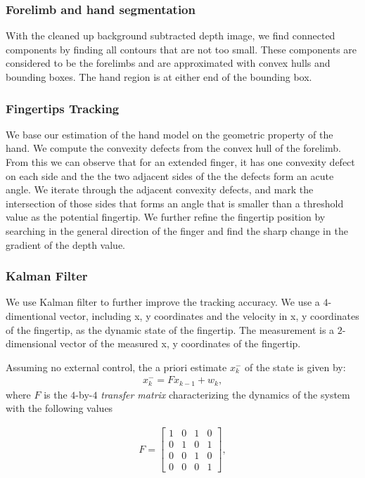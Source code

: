 \subsubsection{Forelimb and hand segmentation}
With the cleaned up background subtracted depth image, we find connected
components by finding all contours that are not too small. These components are
considered to be the forelimbs and are approximated with convex hulls and 
bounding boxes. The hand region is at either end of the bounding box.

\subsubsection{Fingertips Tracking}
We base our estimation of the hand model on the geometric property of the
hand. We compute the convexity defects from the convex hull of the forelimb.
From this we can observe that for an extended finger, it has one convexity
defect on each side and the the two adjacent sides of the the defects form an
acute angle. We iterate through the adjacent convexity defects, and mark the
intersection of those sides that forms an angle that is smaller than a threshold
value as the potential fingertip. We further refine the fingertip position by
searching in the general direction of the finger and find the sharp change in
the gradient of the depth value.


\subsubsection{Kalman Filter}
We use Kalman filter to further improve the tracking accuracy. We use a
$4$-dimentional vector, including x, y coordinates and the velocity in x, y
coordinates of the fingertip, as the dynamic state of the fingertip.
The measurement is a $2$-dimensional vector of the measured x, y
coordinates of the fingertip. 

Assuming no external control, the a priori estimate $x_k^-$ of the state is
given by:
\begin{align*}
x_k^- = Fx_{k - 1} + w_k,
\end{align*}
where $F$ is the $4$-by-$4$ \textit{transfer matrix} characterizing the
dynamics of the system with the following values

\begin{align*}
F = \left[ \begin{array}{cccc}
	1 & 0 & 1 & 0 \\
	0 & 1 & 0 & 1 \\
	0 & 0 & 1 & 0 \\
	0 & 0 & 0 & 1 \end{array} \right],
\end{align*}

